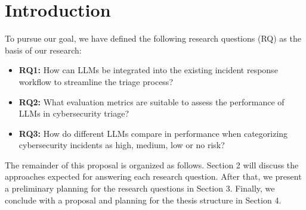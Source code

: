 \section{Introduction}
\label{sec:introduction}

To pursue our goal, we have defined the following research questions (RQ) as the basis of our research:

\begin{itemize}
    \item \textbf{RQ1:} How can LLMs be integrated into the existing incident response workflow to streamline the triage process?
    \item \textbf{RQ2:} What evaluation metrics are suitable to assess the performance of LLMs in cybersecurity triage?
    \item \textbf{RQ3:} How do different LLMs compare in performance when categorizing cybersecurity incidents as high, medium, low or no risk?
\end{itemize}

The remainder of this proposal is organized as follows.
Section 2 will discuss the approaches expected for answering each research question.
After that, we present a preliminary planning for the research questions in Section 3.
Finally, we conclude with a proposal and planning for the thesis structure in Section 4.
